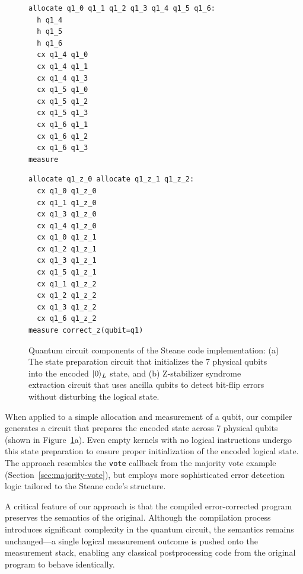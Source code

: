 \begin{figure}[t]
\begin{minipage}{0.48\textwidth}
\begin{verbatim}
allocate q1_0 q1_1 q1_2 q1_3 q1_4 q1_5 q1_6:
  h q1_4
  h q1_5
  h q1_6
  cx q1_4 q1_0
  cx q1_4 q1_1
  cx q1_4 q1_3
  cx q1_5 q1_0
  cx q1_5 q1_2
  cx q1_5 q1_3
  cx q1_6 q1_1
  cx q1_6 q1_2
  cx q1_6 q1_3
measure
\end{verbatim}
\end{minipage}
\hfill
\begin{minipage}{0.48\textwidth}
\begin{verbatim}
allocate q1_z_0 allocate q1_z_1 q1_z_2:
  cx q1_0 q1_z_0
  cx q1_1 q1_z_0
  cx q1_3 q1_z_0
  cx q1_4 q1_z_0
  cx q1_0 q1_z_1
  cx q1_2 q1_z_1
  cx q1_3 q1_z_1
  cx q1_5 q1_z_1
  cx q1_1 q1_z_2
  cx q1_2 q1_z_2
  cx q1_3 q1_z_2
  cx q1_6 q1_z_2
measure correct_z(qubit=q1)
\end{verbatim}
\end{minipage}
\caption{Quantum circuit components of the Steane code implementation: (a) The state preparation circuit that initializes the 7 physical qubits into the encoded $|0\rangle_L$ state, and (b) Z-stabilizer syndrome extraction circuit that uses ancilla qubits to detect bit-flip errors without disturbing the logical state.}
\label{fig:steane-code-circuits}
\end{figure}

When applied to a simple allocation and measurement of a qubit, our compiler generates a circuit that prepares the encoded state across 7 physical qubits (shown in Figure~\ref{fig:steane-code-circuits}a). Even empty kernels with no logical instructions undergo this state preparation to ensure proper initialization of the encoded logical state. The approach resembles the \texttt{vote} callback from the majority vote example (Section~\ref{sec:majority-vote}), but employs more sophisticated error detection logic tailored to the Steane code's structure.

A critical feature of our approach is that the compiled error-corrected program preserves the semantics of the original. Although the compilation process introduces significant complexity in the quantum circuit, the semantics remains unchanged—a single logical measurement outcome is pushed onto the measurement stack, enabling any classical postprocessing code from the original program to behave identically.

